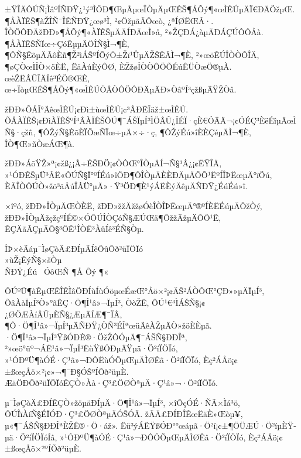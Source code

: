 \documentclass[12pt,openany,CJK,oneside]{cctbook}
\begin{document}
\thispagestyle{empty}
{\Large \kaishu

±ŸÎÄÔÚÑ¡ÌâºÍÑÐŸ¿¹ý³ÌÖÐ¶ŒµÃµœÎÒµÄµŒÊŠ¶ÅÕý¶«œÌÊÚµÄÏ€ÐÄÖžµŒ. ¶ÅÀÏÊŠ¶àŽÎÑ¯ÎÊÑÐŸ¿œø³Ì, ²¢ÖžµãÃÔœò, ¿ªÍØËŒÂ·. ÎÒÖÔÐÄžÐÐ»¶ÅÕý¶«ÀÏÊŠµÄÄÍÐÄœÌ»å, ²»ŽÇÐÁ¿àµÄÐÁÇÚÔÔÅà. ¶ÅÀÏÊŠÑÏœ÷ÇóÊµµÄÖÎÑ§Ì¬¶È, ¶ÔÑ§ÊõµÄÃôÈñ¶Ž²ìÁŠºÍÕýÖ±Žï¹ÛµÄŽŠÊÂÌ¬¶È, ²»œöÊÚÎÒÒÔÎÄ, ¶øÇÒœÌÎÒ×öÈË, ËäÀúÈýÔØ, ÈŽžøÎÒÒÔÖÕÉúÊÜÒæÖ®µÀ. œèŽËÂÛÎÄÍê³ÉÖ®ŒÊ, œ÷ÏòµŒÊŠ¶ÅÕý¶«œÌÊÚÖÂÒÔÖÔÐÄµÄÐ»ÒâºÍ³çžßµÄŸŽÒâ.

žÐÐ»ÕÅÎ°ÄêœÌÊÚ¡¢Ðì±ùœÌÊÚ¡¢³ÂÐËÎäž±œÌÊÚ. ÕÅÀÏÊŠ¡¢ÐìÀÏÊŠºÍ³ÂÀÏÊŠÔÚ¶¯ÁŠÏµÍ³ÌÖÂÛ¿ÎÉÏ·çÈ€ÓÄÄ¬¡¢ÓÉÇ³ÈëÉîµÄœÌÑ§·çžñ, ¶ÔŽýÑ§ÊõÈÏÕæÑÏœ÷µÄ×÷·ç, ¶ÔŽýÉú»îÈÈÇéµÄÌ¬¶È, ÎÒ¶Œ»ñÒæÁŒ¶à.

žÐÐ»ÁõŸŽ»ª¡¢žß¿¡Ã÷ÊŠÐÖ¡¢ÒÔŒ°ÎÒµÄÍ¬Ñ§³Â¿­¡¢ËŸÎÄ, »¹ÓÐÊŠµÜ³ÂË«ÔÚÑ§Ï°ºÍÉú»îÖÐ¶ÔÎÒµÄÈÈÐÄµÄÕÕ¹ËºÍÎÞËœµÄ°ïÖú, ÈÃÎÒÔÚÒ»žö³äÂúÎÂÜ°µÄ»·Ÿ³ÖÐ¶È¹ýÁËÈýÄêµÄÑÐŸ¿ÉúÉú»î.

×îºó, žÐÐ»ÎÒµÄŒÒÈË, žÐÐ»žžÄžžøÓèÎÒÎÞËœµÄ°®ºÍÈËÉúµÄÖžÒý, žÐÐ»ÎÒµÄžçžçºÍÉ©×ÓÔÚÎÒÇóÑ§ÆÚŒä¶ÔžžÄžµÄÕÕ¹Ë, ÊÇÄãÃÇµÄÖ§³ÖÊ¹ÎÒË³ÀûÍê³ÉÑ§Òµ.

}


\def\beq{\begin{equation}}
\def\eeq{\end{equation}}
\makeatletter {} \makeatother

\cleardoublepage
\parskip 10pt
\baselineskip 20pt \frontmatter \thispagestyle{empty}
\vspace*{0.3cm}
\begin{center}{\Large \heiti ÎÞ×èÄáµ¯ÌøÇòÄ£ÐÍµÄÍêÕûÕð²üÏÖÏó}\\
\vspace{0.2cm}
»ùŽ¡ÊýÑ§×šÒµ\\
\vspace{0.2cm} {\heiti ÑÐŸ¿Éú\ } {\kaishu ÓôŒÑ}  {\kaishu ¶Å Õý ¶«}\end{center}

\vspace{0.7cm}
ÔÚºÜ¶àÊµŒÊÎÊÌâÖÐÍùÍùÓöµœÉæŒ°Åö×²¡¢ÄŠ²ÁÒÔŒ°ÇÐ»»µÄÏµÍ³, ÕâÀàÏµÍ³Ò»°ãÊÇ·Ö¶Î¹â»¬ÏµÍ³, ÒòŽË, ÔÚ¹€³ÌÁŠÑ§¡¢¿ØÖÆÀíÂÛµÈÑ§¿ÆµÄÍÆ¶¯ÏÂ, ¶Ô·Ö¶Î¹â»¬ÏµÍ³µÄÑÐŸ¿ÒÑ³ÉÎªœüÄêÀŽµÄÒ»žöÈÈµã. ·Ö¶Î¹â»¬ÏµÍ³ŸßÓÐÊ®·ÖžŽÔÓµÄ¶¯ÁŠÑ§ÐÐÎª, ²»œö°üº¬ÁË¹â»¬ÏµÍ³ËùŸßÓÐµÄŸ­µä·Ö²íÏÖÏó, »¹ÓÐºÜ¶àÓÉ·Ç¹â»¬ÐÔËùÓÕµŒµÄÌØÊâ·Ö²íÏÖÏó, Èç²ÁÅö¡¢±ßœçÅö×²¡¢»¬¶¯Ð§ÓŠºÍÕð²üµÈ. ÆäÖÐÕð²üÏÖÏóÊÇÒ»Àà·Ç³£ÖØÒªµÄ·Ç¹â»¬·Ö²íÏÖÏó.

µ¯ÌøÇòÄ£ÐÍÊÇÒ»žöµäÐÍµÄ·Ö¶Î¹â»¬ÏµÍ³, ×îÔçÓÉ·ÑÃ×Ìá³ö, ÔÚÎïÀíÑ§ÉÏÓÐ·Ç³£ÖØÒªµÄÓŠÓÃ. žÃÄ£ÐÍÐÎÊœËäÈ»Œòµ¥, µ«¶¯ÁŠÑ§ÐÐÎªÈŽÊ®·Ö·áž». Ëü³ýÁËŸßÓÐ°°œáµã·Ö²í¡¢±¶ÖÜÆÚ·Ö²íµÈŸ­µä·Ö²íÏÖÏóÍâ, »¹ÓÐºÜ¶àÓÉ·Ç¹â»¬ÐÔÓÕµŒµÄÌØÊâ·Ö²íÏÖÏó, Èç²ÁÅö¡¢±ßœçÅö×²ºÍÕð²üµÈ.
\end{document}
